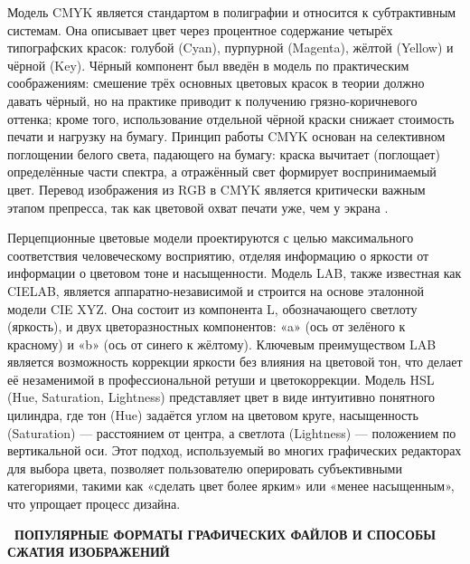 \documentclass{SibFU-docs}
\begin{document}

Модель CMYK является стандартом в полиграфии и относится к субтрактивным системам. Она описывает цвет через процентное содержание четырёх типографских красок: голубой (Cyan), пурпурной (Magenta), жёлтой (Yellow) и чёрной (Key). Чёрный компонент был введён в модель по практическим соображениям: смешение трёх основных цветовых красок в теории должно давать чёрный, но на практике приводит к получению грязно-коричневого оттенка; кроме того, использование отдельной чёрной краски снижает стоимость печати и нагрузку на бумагу. Принцип работы CMYK основан на селективном поглощении белого света, падающего на бумагу: краска вычитает (поглощает) определённые части спектра, а отражённый свет формирует воспринимаемый цвет. Перевод изображения из RGB в CMYK является критически важным этапом препресса, так как цветовой охват печати уже, чем у экрана \cite{cmyk2021}.


Перцепционные цветовые модели проектируются с целью максимального соответствия человеческому восприятию, отделяя информацию о яркости от информации о цветовом тоне и насыщенности. Модель LAB, также известная как CIELAB, является аппаратно-независимой и строится на основе эталонной модели CIE XYZ. Она состоит из компонента L, обозначающего светлоту (яркость), и двух цветоразностных компонентов: «a» (ось от зелёного к красному) и «b» (ось от синего к жёлтому). Ключевым преимуществом LAB является возможность коррекции яркости без влияния на цветовой тон, что делает её незаменимой в профессиональной ретуши и цветокоррекции. Модель HSL (Hue, Saturation, Lightness) представляет цвет в виде интуитивно понятного цилиндра, где тон (Hue) задаётся углом на цветовом круге, насыщенность (Saturation) — расстоянием от центра, а светлота (Lightness) — положением по вертикальной оси. Этот подход, используемый во многих графических редакторах для выбора цвета, позволяет пользователю оперировать субъективными категориями, такими как «сделать цвет более ярким» или «менее насыщенным», что упрощает процесс дизайна.

\newpage
{}
\vspace*{-1.5em}
\begin{center}\textbf{\thesection\ ПОПУЛЯРНЫЕ ФОРМАТЫ ГРАФИЧЕСКИХ ФАЙЛОВ И СПОСОБЫ СЖАТИЯ ИЗОБРАЖЕНИЙ}\end{center}
\vspace*{-1.5em}
\end{document}
